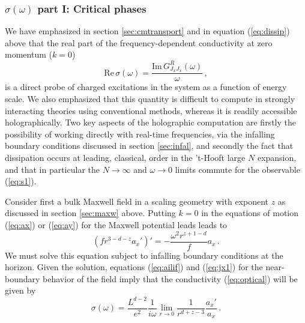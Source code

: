\documentclass[10pt, oneside]{book}
\def\be{\begin{equation}}
\def\ee{\end{equation}}
\begin{document}
\begin{doublespace}
\subsubsection{$\sigma(\omega)$ part I: Critical phases}

We have emphasized in section \ref{sec:cmtransport} and in equation (\ref{eq:dissip}) above that the real part of the frequency-dependent conductivity at zero momentum ($k=0$)
\be\label{eq:s1}
\text{Re} \, \sigma(\omega) = \frac{\text{Im} \, G_{J_xJ_x}^R(\omega)}{\omega} \,,
\ee
is a direct probe of charged excitations in the system as a function of energy scale. We also emphasized that this quantity is difficult to compute in strongly interacting theories using conventional methods, whereas it is readily accessible holographically. Two key aspects of the holographic computation are firstly the possibility of working directly with real-time frequencies, via the infalling boundary conditions discussed in section \ref{sec:infal}, and secondly the fact that dissipation occurs at leading, classical, order in the 't-Hooft large $N$ expansion, and that in particular the $N \to \infty$ and $\omega \to 0$ limits commute for the observable (\ref{eq:s1}).

Consider first a bulk Maxwell field in a scaling geometry with exponent $z$ as discussed in section \ref{sec:maxw} above.
Putting $k=0$ in the equations of motion (\ref{eq:ax}) or (\ref{eq:ay}) for the Maxwell potential leads leads to
\be\label{eq:axx}
\left(f r^{3-d-z} a_x' \right)' = - \frac{\omega^2 r^{z+1-d}}{f} a_x \,.
\ee
We must solve this equation subject to infalling boundary conditions at the horizon. Given the solution, equations (\ref{eq:ailif}) and (\ref{eq:jx1}) for the near-boundary behavior of the field imply that the conductivity (\ref{eq:optical}) will be given by
\be\label{eq:ssw}
\sigma(\omega) = \frac{L^{d-2}}{e^2} \frac{1}{i \omega} \lim_{r \to 0} \frac{1}{r^{d+z-3}} \frac{a_x'}{a_x} \,.
\ee


\end{doublespace}
\end{document}

